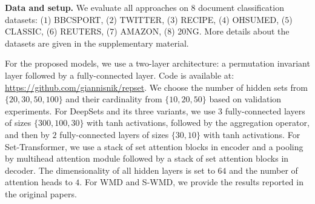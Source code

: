 \documentclass[twoside]{article}
\begin{document}
\begin{table*}[t] 
  \centering
  \caption{Terms of the employed pre-trained model that are most similar to the elements and centroids of $5$ hidden sets.}
  \label{tab:latent_sets}
\end{table*}

\noindent\textbf{Data and setup.}
We evaluate all approaches on $8$ document classification datasets: ($1$) BBCSPORT, ($2$) TWITTER, ($3$) RECIPE, ($4$) OHSUMED, ($5$) CLASSIC, ($6$) REUTERS, ($7$) AMAZON, ($8$) 20NG.
More details about the datasets are given in the supplementary material.

For the proposed models, we use a two-layer architecture: a permutation invariant layer followed by a fully-connected layer.
Code is available at: \url{https://github.com/giannisnik/repset}.
We choose the number of hidden sets from $\{ 20,30,50,100 \}$ and their cardinality from $\{ 10,20,50 \}$ based on validation experiments.
For DeepSets and its three variants, we use $3$ fully-connected layers of sizes $\{300,100,30\}$ with tanh activations, followed by the aggregation operator, and then by $2$ fully-connected layers of sizes $\{30, 10\}$ with tanh activations.
For Set-Transformer, we use a stack of set attention blocks in encoder and a pooling by multihead attention module followed by a stack of set attention blocks in decoder.
The dimensionality of all hidden layers is set to $64$ and the number of attention heads to $4$.
For WMD and S-WMD, we provide the results reported in the original papers.
\end{document}
